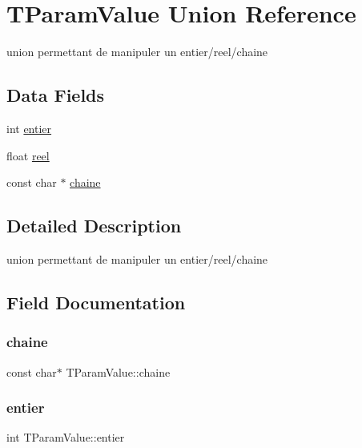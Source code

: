 \hypertarget{unionTParamValue}{}\section{T\+Param\+Value Union Reference}
\label{unionTParamValue}


union permettant de manipuler un entier/reel/chaine  


\subsection*{Data Fields}
\begin{DoxyCompactItemize}
\item 
int \hyperlink{unionTParamValue_a85a2847d254115d744ac7d55391dc1ea}{entier}
\item 
float \hyperlink{unionTParamValue_a6c6e99a421de592ad46cf47aab9cef58}{reel}
\item 
const char $\ast$ \hyperlink{unionTParamValue_a3e12f31017e3dd1bb79801330f767a22}{chaine}
\end{DoxyCompactItemize}


\subsection{Detailed Description}
union permettant de manipuler un entier/reel/chaine 

\subsection{Field Documentation}
\mbox{\label{unionTParamValue_a3e12f31017e3dd1bb79801330f767a22}} 
\subsubsection{\texorpdfstring{chaine}{chaine}}
{\footnotesize\ttfamily const char$\ast$ T\+Param\+Value\+::chaine}

\mbox{\label{unionTParamValue_a85a2847d254115d744ac7d55391dc1ea}} 
\subsubsection{\texorpdfstring{entier}{entier}}
{\footnotesize\ttfamily int T\+Param\+Value\+::entier}

